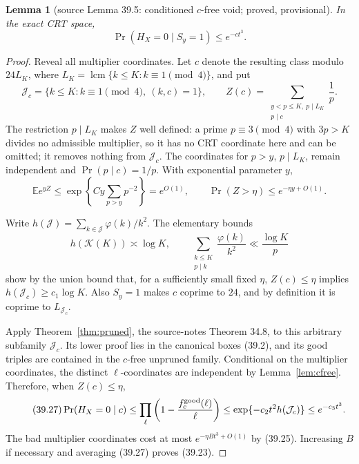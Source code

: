 \documentclass[10pt,reqno]{amsart}
\newtheorem{lemma}[theorem]{Lemma}
\theoremstyle{definition}
\newcommand{\lcm}{\operatorname {lcm}}
\newcommand{\1}{\mathbf 1}
\begin{document}
\begin{lemma}[source Lemma 39.5: conditioned $c$-free void; proved,
provisional]\label{lem:conditioned-void}
In the exact CRT space,
\begin{equation}\tag{39.23}
 \Pr(H_X=0\mid S_y=1)\leq e^{-ct^3}.
\end{equation}
\end{lemma}
\begin{proof}
Reveal all multiplier coordinates.  Let $c$ denote the resulting class
modulo $24L_K$, where
$L_K=\lcm\{k\leq K:k\equiv1\pmod4\}$, and put
\begin{equation}\tag{39.24}
 \mathcal J_c=\{k\leq K:k\equiv1\pmod4,\ (k,c)=1\},
 \qquad
 Z(c)=\sum_{\substack{y<p\leq K,\ p\mid L_K\\p\mid c}}\frac1p.
\end{equation}
The restriction $p\mid L_K$ makes $Z$ well defined: a prime
$p\equiv3\pmod4$ with $3p>K$ divides no admissible multiplier, so it has
no CRT coordinate here and can be omitted; it removes nothing from
$\mathcal J_c$.  The coordinates for $p>y$, $p\mid L_K$, remain independent
and $\Pr(p\mid c)=1/p$.  With exponential parameter $y$,
\begin{equation}\tag{39.25}
 \mathbb E e^{yZ}
 \leq\exp\left\{Cy\sum_{p>y}p^{-2}\right\}=e^{O(1)},
 \qquad \Pr(Z>\eta)\leq e^{-\eta y+O(1)}.
\end{equation}

Write $h(\mathcal J)=\sum_{k\in\mathcal J}\varphi(k)/k^2$.  The elementary
bounds
\begin{equation}\tag{39.26}
 h(\mathcal K(K))\asymp\log K,
 \qquad
 \sum_{\substack{k\leq K\\p\mid k}}\frac{\varphi(k)}{k^2}
 \ll\frac{\log K}{p}
\end{equation}
show by the union bound that, for a sufficiently small fixed $\eta$,
$Z(c)\leq\eta$ implies
$h(\mathcal J_c)\geq c_1\log K$.  Also $S_y=1$ makes $c$ coprime to $24$,
and by definition it is coprime to $L_{\mathcal J_c}$.

Apply Theorem~\ref{thm:pruned}, the source-notes Theorem 34.8, to this
arbitrary subfamily $\mathcal J_c$.  Its lower proof lies in the canonical
boxes (39.2), and its good triples are contained in the $c$-free unpruned
family.  Conditional on the multiplier coordinates, the distinct
$\ell$-coordinates are independent by Lemma~\ref{lem:cfree}.  Therefore,
when $Z(c)\leq\eta$,
\begin{equation}\tag{39.27}
 \Pr(H_X=0\mid c)
 \leq\prod_\ell\left(1-\frac{f_c^{\rm good}(\ell)}\ell\right)
 \leq\exp\{-c_2t^2h(\mathcal J_c)\}
 \leq e^{-c_3t^3}.
\end{equation}
The bad multiplier coordinates cost at most
$e^{-\eta Bt^3+O(1)}$ by (39.25).  Increasing $B$ if necessary and averaging
(39.27) proves (39.23).
\end{proof}
\end{document}

